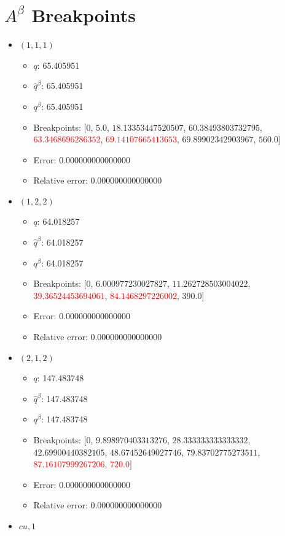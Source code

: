 \documentclass{article}%
\begin{document}
\section{$A^\beta$ Breakpoints}%
\thispagestyle{plain}%
\begin{itemize}%
	\item $(1, 1, 1)$%
	\begin{itemize}%
		\item $q$: 65.405951%
		\item $\hat{q}^\beta$: 65.405951%
		\item $q^\beta$: 65.405951%
		\item Breakpoints: $[$$0$, $5.0$, $18.13353447520507$, $60.38493803732795$, \textcolor{red}{$63.3468696286352$}, \textcolor{red}{$69.14107665413653$}, $69.89902342903967$, $560.0$$]$%
		\item Error: 0.000000000000000%
		\item Relative error: 0.000000000000000%
	\end{itemize}%
	\item $(1, 2, 2)$%
	\begin{itemize}%
		\item $q$: 64.018257%
		\item $\hat{q}^\beta$: 64.018257%
		\item $q^\beta$: 64.018257%
		\item Breakpoints: $[$$0$, $6.000977230027827$, $11.262728503004022$, \textcolor{red}{$39.36524453694061$}, \textcolor{red}{$84.1468297226002$}, $390.0$$]$%
		\item Error: 0.000000000000000%
		\item Relative error: 0.000000000000000%
	\end{itemize}%
	\item $(2, 1, 2)$%
	\begin{itemize}%
		\item $q$: 147.483748%
		\item $\hat{q}^\beta$: 147.483748%
		\item $q^\beta$: 147.483748%
		\item Breakpoints: $[$$0$, $9.898970403313276$, $28.333333333333332$, $42.69900440382105$, $48.67452649027746$, $79.83702775273511$, \textcolor{red}{$87.16107999267206$}, \textcolor{red}{$720.0$}$]$%
		\item Error: 0.000000000000000%
		\item Relative error: 0.000000000000000%
	\end{itemize}%
	\item $\textit{cu},1$%

\end{itemize}
\end{document}
